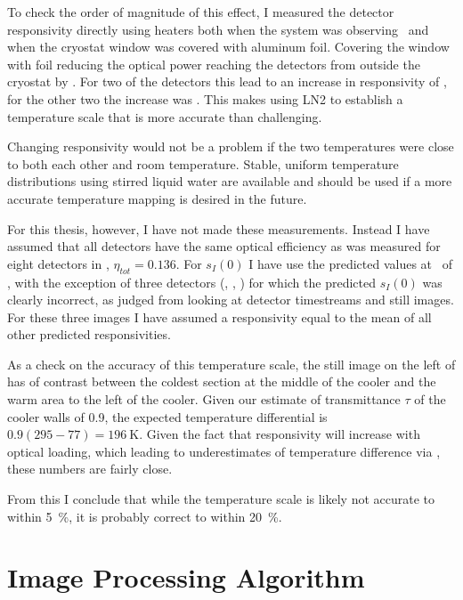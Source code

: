 To check the order of magnitude of this effect, I measured the detector responsivity directly using heaters both when the system was observing \ecco\ and when the cryostat window was covered with aluminum foil.
Covering the window with foil reducing the optical power reaching the detectors from outside the cryostat by .
For two of the detectors this lead to an increase in responsivity of , for the other two the increase was .
This makes using LN2 to establish a temperature scale that is more accurate than  challenging.

Changing responsivity would not be a problem if the two temperatures were close to both each other and room temperature.
Stable, uniform temperature distributions using stirred liquid water are available \cite{dietlein_aqueous_2008} and should be used if a more accurate temperature mapping is desired in the future.

For this thesis, however, I have not made these measurements.
Instead I have assumed that all detectors have the same optical efficiency as was measured for eight detectors in , $\eta_{tot} = 0.136$.
For $s_I(0)$ I have use the predicted values at \SOC\ of , with the exception of three detectors (, , ) for which the predicted $s_I(0)$ was clearly incorrect, as judged from looking at detector timestreams and still images.
For these three images I have assumed a responsivity equal to the mean of all other predicted responsivities.

As a check on the accuracy of this temperature scale, the still image on the left of  has  of contrast between the coldest section at the middle of the cooler and the warm area to the left of the cooler.
Given our estimate of transmittance $\tau$ of the cooler walls of \num{0.9}, the expected temperature differential is $0.9(295-77) = \SI{196}{\K}$.
Given the fact that responsivity will increase with optical loading, which leading to underestimates of temperature difference via , these numbers are fairly close.

From this I conclude that while the temperature scale is likely not accurate to within \SI{5}{\percent}, it is probably correct to within \SI{20}{\percent}.

\section{Image Processing Algorithm} \label{sec:ch8-algo}

